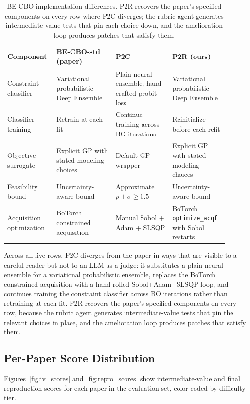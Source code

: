 \documentclass[11pt]{article}
\begin{document}
\begin{table}[t]
\centering
\small
\begin{tabular}{p{0.18\linewidth}p{0.25\linewidth}p{0.24\linewidth}p{0.23\linewidth}}
\toprule
\textbf{Component} & \textbf{BE-CBO-std (paper)} & \textbf{P2C} & \textbf{P2R (ours)} \\
\midrule
Constraint classifier
& Variational probabilistic Deep Ensemble
& Plain neural ensemble; hand-crafted probit loss
& Variational probabilistic Deep Ensemble \\
Classifier training
& Retrain at each fit
& Continue training across BO iterations
& Reinitialize before each refit \\
Objective surrogate
& Explicit GP with stated modeling choices
& Default GP wrapper
& Explicit GP with stated modeling choices \\
Feasibility bound
& Uncertainty-aware bound
& Approximate $p+\sigma\geq 0.5$
& Uncertainty-aware bound \\
Acquisition optimization
& BoTorch constrained acquisition
& Manual Sobol + Adam + SLSQP
& BoTorch \texttt{optimize\_acqf} with Sobol restarts \\
\bottomrule
\end{tabular}
\caption{BE-CBO implementation differences. P2R recovers the
paper's specified components on every row where P2C diverges;
the rubric agent generates intermediate-value tests that pin
each choice down, and the amelioration loop produces patches
that satisfy them.}
\label{tab:becbo_impl_diff}
\end{table}

Across all five rows, P2C diverges from the paper in ways that
are visible to a careful reader but not to an LLM-as-a-judge: it
substitutes a plain neural ensemble for a variational
probabilistic ensemble, replaces the BoTorch constrained
acquisition with a hand-rolled Sobol+Adam+SLSQP loop, and
continues training the constraint classifier across BO
iterations rather than retraining at each fit. P2R recovers the
paper's specified components on every row, because the rubric
agent generates intermediate-value tests that pin the relevant
choices in place, and the amelioration loop produces patches
that satisfy them.

\subsection{Per-Paper Score Distribution}

Figures~\ref{fig:iv_scores} and~\ref{fig:repro_scores} show
intermediate-value and final reproduction scores for each paper
in the evaluation set, color-coded by difficulty tier.
\end{document}
